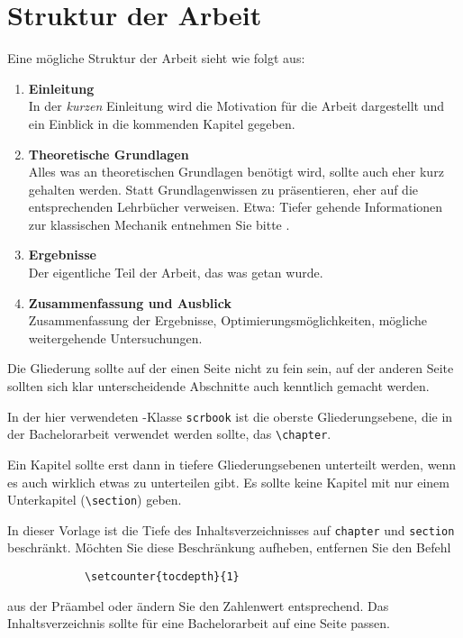\chapter{Struktur der Arbeit}

Eine mögliche Struktur der Arbeit sieht wie folgt aus:

\begin{enumerate}
    \item \textbf{Einleitung}\\
        In der \emph{kurzen} Einleitung wird die Motivation für die Arbeit
        dargestellt und ein Einblick in die kommenden Kapitel gegeben.
    \item \textbf{Theoretische Grundlagen}\\
        Alles was an theoretischen Grundlagen benötigt wird, sollte auch eher kurz gehalten werden.
        Statt Grundlagenwissen zu präsentieren, eher auf die entsprechenden Lehrbücher verweisen.
        Etwa: Tiefer gehende Informationen zur klassischen Mechanik entnehmen Sie bitte \cite{kuypers}.
    \item \textbf{Ergebnisse} \\
        Der eigentliche Teil der Arbeit, das was getan wurde.
    \item \textbf{Zusammenfassung und Ausblick} \\
        Zusammenfassung der Ergebnisse, Optimierungsmöglichkeiten, mögliche weitergehende Untersuchungen.
\end{enumerate}

Die Gliederung sollte auf der einen Seite nicht zu fein sein, auf der anderen Seite
sollten sich klar unterscheidende Abschnitte auch kenntlich gemacht werden.

In der hier verwendeten \KOMAScript-Klasse \texttt{scrbook} ist die oberste Gliederungsebene,
die in der Bachelorarbeit verwendet werden sollte, das \texttt{\textbackslash chapter}.

Ein Kapitel sollte erst dann in tiefere Gliederungsebenen unterteilt werden, wenn es auch wirklich etwas zu unterteilen gibt. Es sollte keine Kapitel mit nur einem Unterkapitel (\texttt{\textbackslash section}) geben.

In dieser Vorlage ist die Tiefe des Inhaltsverzeichnisses auf \texttt{chapter} und \texttt{section} beschränkt. Möchten Sie diese Beschränkung aufheben, entfernen Sie den Befehl
\begin{verbatim}
            \setcounter{tocdepth}{1}
\end{verbatim}
aus der Präambel oder ändern Sie den Zahlenwert entsprechend. Das Inhaltsverzeichnis sollte für eine Bachelorarbeit auf eine Seite passen.
